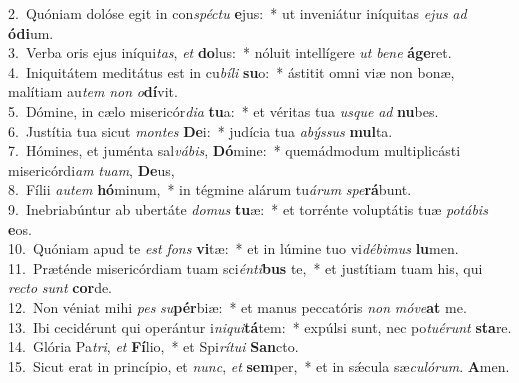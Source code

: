 {2.~}Quóniam dolóse egit in con\textit{spé}\textit{ctu} \textbf{e}jus:~* ut inveniátur iníquitas \textit{e}\textit{jus} \textit{ad} \textbf{ó}\textbf{di}um.\\
{3.~}Verba oris ejus iníqui\textit{tas}, \textit{et} \textbf{do}lus:~* nóluit intellígere \textit{ut} \textit{be}\textit{ne} \textbf{á}\textbf{ge}ret.\\
{4.~}Iniquitátem meditátus est in cu\textit{bí}\textit{li} \textbf{su}o:~* ástitit omni viæ non bonæ, malítiam au\textit{tem} \textit{non} \textit{o}\textbf{dí}vit.\\
{5.~}Dómine, in cælo misericór\textit{di}\textit{a} \textbf{tu}a:~* et véritas tua \textit{us}\textit{que} \textit{ad} \textbf{nu}bes.\\
{6.~}Justítia tua sicut \textit{mon}\textit{tes} \textbf{De}i:~* judícia tua \textit{a}\textit{býs}\textit{sus} \textbf{mul}ta.\\
{7.~}Hómines, et juménta sal\textit{vá}\textit{bis}, \textbf{Dó}mine:~* quemádmodum multiplicásti misericórdi\textit{am} \textit{tu}\textit{am}, \textbf{De}us,\\
{8.~}Fílii \textit{au}\textit{tem} \textbf{hó}minum,~* in tégmine alárum tu\textit{á}\textit{rum} \textit{spe}\textbf{rá}bunt.\\
{9.~}Inebriabúntur ab ubertáte \textit{do}\textit{mus} \textbf{tu}æ:~* et torrénte voluptátis tuæ \textit{po}\textit{tá}\textit{bis} \textbf{e}os.\\
{10.~}Quóniam apud te \textit{est} \textit{fons} \textbf{vi}tæ:~* et in lúmine tuo vi\textit{dé}\textit{bi}\textit{mus} \textbf{lu}men.\\
{11.~}Præténde misericórdiam tuam sci\textit{én}\textit{ti}\textbf{bus} te,~* et justítiam tuam his, qui \textit{re}\textit{cto} \textit{sunt} \textbf{cor}de.\\
{12.~}Non véniat mihi \textit{pes} \textit{su}\textbf{pér}biæ:~* et manus peccatóris \textit{non} \textit{mó}\textit{ve}\textbf{at} me.\\
{13.~}Ibi cecidérunt qui operántur i\textit{ni}\textit{qui}\textbf{tá}tem:~* expúlsi sunt, nec po\textit{tu}\textit{é}\textit{runt} \textbf{sta}re.\\
{14.~}Glória Pa\textit{tri}, \textit{et} \textbf{Fí}lio,~* et Spi\textit{rí}\textit{tu}\textit{i} \textbf{San}cto.\\
{15.~}Sicut erat in princípio, et \textit{nunc}, \textit{et} \textbf{sem}per,~* et in sǽcula sæ\textit{cu}\textit{ló}\textit{rum}. \textbf{A}men.\\

